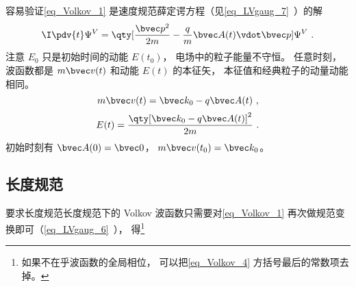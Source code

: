 容易验证\autoref{eq_Volkov_1} 是速度规范薛定谔方程（见\autoref{eq_LVgaug_7}~）的解
\begin{equation}
\I \pdv{t} \Psi^V = \qty[\frac{\bvec p^2}{2m} - \frac{q}{m}\bvec A(t) \vdot \bvec p] \Psi^V~.
\end{equation}
注意 $E_0$ 只是初始时间的动能 $E(t_0)$， 电场中的粒子能量不守恒。 任意时刻， 波函数都是 $m\bvec v(t)$ 和动能 $E(t)$ 的本征矢， 本征值和经典粒子的动量动能相同。
\begin{equation}\label{eq_Volkov_5}
m\bvec v(t) = \bvec k_0 - q\bvec A(t)~,
\end{equation}
\begin{equation}
E(t) = \frac{\qty[\bvec k_0 - q\bvec A(t)]^2}{2m}~.
\end{equation}
初始时刻有 $\bvec A(0) = \bvec 0$， $m\bvec v(t_0) = \bvec k_0$。

\subsection{长度规范}
要求长度规范长度规范下的 Volkov 波函数只需要对\autoref{eq_Volkov_1} 再次做规范变换即可（\autoref{eq_LVgaug_6}~）， 得\footnote{如果不在乎波函数的全局相位， 可以把\autoref{eq_Volkov_4} 方括号最后的常数项去掉。}
